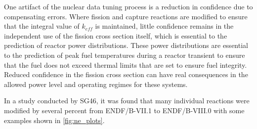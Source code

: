 \documentclass[letterpaper]{ar-1col}
\begin{document}
One artifact of the nuclear data tuning process is a reduction in confidence due to compensating errors. Where fission and capture reactions are modified to ensure that the integral value of $k_{eff}$ is maintained, little confidence remains in the independent use of the fission cross section itself, which is essential to the prediction of reactor power distributions. These power distributions are essential to the prediction of peak fuel temperatures during a reactor transient to ensure that the fuel does not exceed thermal limits that are set to ensure fuel integrity. Reduced confidence in the fission cross section can have real consequences in the allowed power level and operating regimes for these systems.

In a study conducted by SG46, it was found that many individual reactions were modified by several percent from ENDF/B-VII.1 to ENDF/B-VIII.0 with some examples shown in \autoref{fig:ne_plots}.
\end{document}
